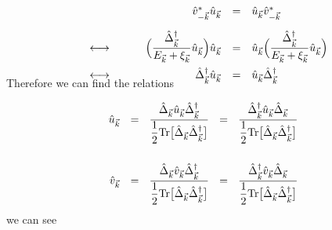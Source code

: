 \documentclass[uplatex,a4j,12pt,dvipdfmx]{jsarticle}
\begin{document}
	\begin{eqnarray}
		\begin{array}{rcrcl}
			 &   &
			\hat{v}_{-\vec{k}}^{*} \hat{u}_{\vec{k}}
			 & = &
			\hat{u}_{\vec{k}} \hat{v}_{-\vec{k}}^{*}
			\nonumber \\[4mm] &\longleftrightarrow& \hspace{8mm}
			\Big( \dfrac{ \hat{\Delta}^{\dagger}_{\vec{k}} }{ E_{\vec{k}} + \xi_{\vec{k}} } \hat{u}_{\vec{k}} \Big)
			\hat{u}_{\vec{k}}
			 & = &
			\hat{u}_{\vec{k}}
			\Big( \dfrac{ \hat{\Delta}^{\dagger}_{\vec{k}} }{ E_{\vec{k}} + \xi_{\vec{k}} } \hat{u}_{\vec{k}} \Big)
			\nonumber \\[4mm] &\longleftrightarrow& \hspace{8mm}
			\hat{\Delta}^{\dagger}_{\vec{k}} \hat{u}_{\vec{k}}
			 & = &
			\hat{u}_{\vec{k}} \hat{\Delta}^{\dagger}_{\vec{k}}
		\end{array}
		\\[-5mm]
	\end{eqnarray}
	Therefore we can find the relations

	\begin{eqnarray}
		\hat{u}_{\vec{k}}
		\ \ = \ \
		\dfrac{ \hat{\Delta}_{\vec{k}} \hat{u}_{\vec{k}} \hat{\Delta}^{\dagger}_{\vec{k}} }{ \dfrac{1}{2} {\rm Tr} \big[ \hat{\Delta}_{\vec{k}} \hat{\Delta}^{\dagger}_{\vec{k}} \big] }
		\ \ = \ \
		\dfrac{ \hat{\Delta}^{\dagger}_{\vec{k}} \hat{u}_{\vec{k}} \hat{\Delta}_{\vec{k}} }{ \dfrac{1}{2} {\rm Tr} \big[ \hat{\Delta}_{\vec{k}} \hat{\Delta}^{\dagger}_{\vec{k}} \big] }
		\\[5mm]
		\hat{v}_{\vec{k}}
		\ \ = \ \
		\dfrac{ \hat{\Delta}_{\vec{k}} \hat{v}_{\vec{k}} \hat{\Delta}^{\dagger}_{\vec{k}} }{ \dfrac{1}{2} {\rm Tr} \big[ \hat{\Delta}_{\vec{k}} \hat{\Delta}^{\dagger}_{\vec{k}} \big] }
		\ \ = \ \
		\dfrac{ \hat{\Delta}^{\dagger}_{\vec{k}} \hat{v}_{\vec{k}} \hat{\Delta}_{\vec{k}} }{ \dfrac{1}{2} {\rm Tr} \big[ \hat{\Delta}_{\vec{k}} \hat{\Delta}^{\dagger}_{\vec{k}} \big] }
	\end{eqnarray}
	we can see
\end{document}
